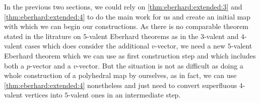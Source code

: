 \label{sec:3:5}

In the previous two sections, we could rely on \autoref{thm:eberhard:extended:3} and \autoref{thm:eberhard:extended:4} to do the main work for us and create an initial map with which we can begin our constructions. As there is no comparable theorem stated in the litrature on $5$-valent {\sc Eberhard} theorems as in the $3$-valent and $4$-valent cases which does consider the additional $v$-vector, we need a new $5$-valent {\sc Eberhard} theorem which we can use as first construction step and which includes both a $p$-vector and a $v$-vector. But the situation is not as difficult as doing a whole construction of a polyhedral map by ourselves, as in fact, we can use \autoref{thm:eberhard:extended:4} nonetheless and just need to convert superfluous $4$-valent vertices into $5$-valent ones in an intermediate step.
\clearpage

